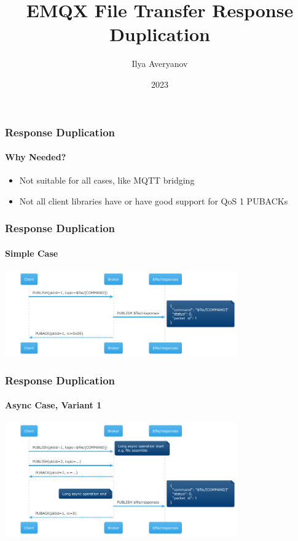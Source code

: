 \documentclass{beamer}
\title{EMQX File Transfer Response Duplication}
\author{Ilya Averyanov}
\institute{EMQX}
\date{2023}
\begin{document}
\frame{\titlepage}

\begin{frame}
    \frametitle{Response Duplication}
    \framesubtitle{Why Needed?}

    \begin{itemize}
        \item Not suitable for all cases, like MQTT bridging
        \item Not all client libraries have or have good support for QoS 1 PUBACKs
    \end{itemize}
\end{frame}


\begin{frame}
    \frametitle{Response Duplication}
    \framesubtitle{Simple Case}

    \begin{center}
        \includegraphics[width=10cm, keepaspectratio]{images/flow-topic-dup-simple.png}
    \end{center}
\end{frame}

\begin{frame}
    \frametitle{Response Duplication}
    \framesubtitle{Async Case, Variant 1}

    \begin{center}
        \includegraphics[width=10cm, keepaspectratio]{images/flow-topic-dup-async-1.png}
    \end{center}
\end{frame}
\end{document}
